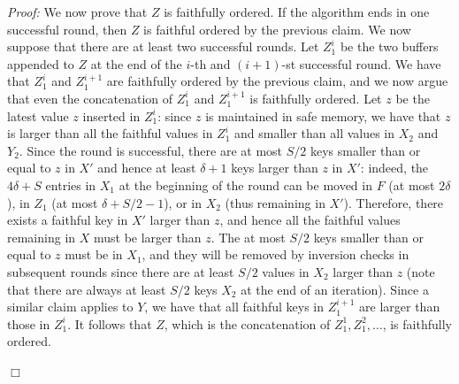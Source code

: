 \documentclass[review,number]{elsarticle}
\renewenvironment{proof}{\begin{trivlist}
                         \item[] {\em Proof:}}{\hfill $\Box$
                       \end{trivlist}}
\newcommand{\X}{{X}}
\newcommand{\Y}{{Y}}
\newcommand{\Z}{{Z}}
\begin{document}
\begin{proof}
We now prove that $Z$ is faithfully ordered. If the algorithm ends in one
successful round, then $Z$ is faithful ordered by the previous claim. We now
suppose that there are at least two successful rounds. Let $\Z^i_1$ be the two
buffers appended to $Z$ at the end of the $i$-th and $(i+1)$-st successful
round. We have that $\Z^i_1$ and $\Z^{i+1}_1$ are faithfully ordered by the
previous claim, and we now argue that even the concatenation of $\Z_1^i$ and
$\Z_1^{i+1}$ is faithfully ordered. Let $z$ be  the latest value $z$ inserted in
$\Z^i_1$: since $z$ is maintained in safe memory, we have that $z$ is larger
than all the faithful values in $\Z^i_1$ and smaller than all values in $\X_2$
and $\Y_2$. Since the round is successful, there are at most $S/2$ keys smaller
than or equal to $z$ in $\X'$ and hence at least $\delta+1$ keys larger than $z$
in $\X'$: indeed, the $4\delta+S$ entries in $\X_1$ at the beginning of the
round can be moved in $F$ (at most $2\delta$), in $\Z_1$ (at most
$\delta+S/2-1$), or in $\X_2$ (thus remaining in $\X'$).  Therefore, there
exists a faithful key in $\X'$ larger than $z$, and hence all the faithful
values remaining in $\X$ must be larger than $z$. The at most $S/2$ keys smaller
than or equal to $z$ must be in $\X_1$, and they will be removed by inversion
checks in subsequent rounds since there are at least $S/2$ values in $\X_2$
larger than $z$ (note that there are always at least $S/2$ keys $\X_2$ at the
end of an iteration). Since a similar claim applies to $Y$, we have that all
faithful keys in $\Z^{i+1}_1$ are larger than those in $\Z^i_1$. It follows that
$Z$, which is  the concatenation of $\Z^1_1, \Z^2_1,\ldots$, is faithfully
ordered.



\end{proof}
\end{document}

